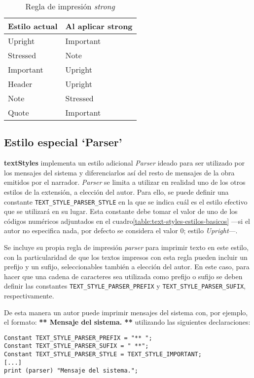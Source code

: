 \documentclass[a4paper,12pt]{article}
\numberwithin{equation}{section}
\begin{document}
\begin{table}[]
\centering
\begin{tabular}{ll}
\hline
\textbf{Estilo actual}	& \textbf{Al aplicar strong} \\ \hline
Upright					& Important						\\
Stressed				& Note							\\
Important				& Upright						\\
Header					& Upright						\\
Note					& Stressed						\\
Quote					& Important						\\ \hline
\end{tabular}
\caption{Regla de impresión \emph{strong}}
\label{table:regla-impresion-strong}
\end{table}

\subsection{Estilo especial `Parser'} \label{sec:estilo-parser}

\textbf{textStyles} implementa un estilo adicional \emph{Parser} ideado para ser utilizado por los mensajes del sistema y diferenciarlos así del resto de mensajes de la obra emitidos por el narrador. \emph{Parser} se limita a utilizar en realidad uno de los otros estilos de la extensión, a elección del autor. Para ello, se puede definir una constante \verb|TEXT_STYLE_PARSER_STYLE| en la que se indica cuál es el estilo efectivo que se utilizará en su lugar. Esta constante debe tomar el valor de uno de los códigos numéricos adjuntados en el cuadro\ref{table:text-styles-estilos-basicos} ---si el autor no especifica nada, por defecto se considera el valor $0$;  estilo \emph{Upright}---.

Se incluye su propia regla de impresión \emph{parser} para imprimir texto en este estilo, con la particularidad de que los textos impresos con esta regla pueden incluir un prefijo y un sufijo, seleccionables también a elección del autor. En este caso, para hacer que una cadena de caracteres sea utilizada como prefijo o sufijo se deben definir las constantes \verb|TEXT_STYLE_PARSER_PREFIX| y \verb|TEXT_STYLE_PARSER_SUFIX|, respectivamente.

De esta manera un autor puede imprimir mensajes del sistema con, por ejemplo, el formato: \textbf{** Mensaje del sistema. **} utilizando las siguientes declaraciones:

\begin{verbatim}
Constant TEXT_STYLE_PARSER_PREFIX = "** ";
Constant TEXT_STYLE_PARSER_SUFIX = " **";
Constant TEXT_STYLE_PARSER_STYLE = TEXT_STYLE_IMPORTANT;
[...]
print (parser) "Mensaje del sistema.";
\end{verbatim}
\end{document}
